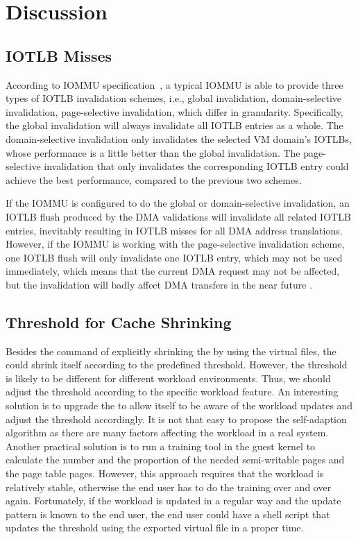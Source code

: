 \section{Discussion}\label{sec:dis}

\subsection{IOTLB Misses}
According to IOMMU specification~\cite{intelvt, amdvt}, a typical IOMMU is able to provide three types of IOTLB invalidation schemes, i.e., global invalidation, domain-selective invalidation, page-selective invalidation, which differ in granularity.
Specifically, the global invalidation will always invalidate all IOTLB entries as a whole.
The domain-selective invalidation only invalidates the selected VM domain's IOTLBs, whose performance is a little better than the global invalidation.
The page-selective invalidation that only invalidates the corresponding IOTLB entry could achieve the best performance, compared to the previous two schemes.

If the IOMMU is configured to do the global or domain-selective invalidation, an IOTLB flush produced by the DMA validations will invalidate all related IOTLB entries, inevitably resulting in IOTLB misses for all DMA address translations. However, if the IOMMU is working with the page-selective invalidation scheme, one IOTLB flush will only invalidate one IOTLB entry, which may not be used immediately, which means that the current DMA request may not be affected, but the invalidation will badly affect DMA transfers in the near future .

\subsection{Threshold for \name Cache Shrinking}
Besides the command of explicitly shrinking the \cache by using the virtual files, the \cache could shrink itself according to the predefined threshold.
However, the threshold is likely to be different for different workload environments.
Thus, we should adjust the threshold according to the specific workload feature.
An interesting solution is to upgrade the \cache to allow itself to be aware of the workload updates and adjust the threshold accordingly.
It is not that easy to propose the self-adaption algorithm as there are many factors affecting the workload in a real system.
Another practical solution is to run a training tool in the guest kernel to calculate the number and the proportion of the needed semi-writable pages and the page table pages.
However, this approach requires that the workload is relatively stable, otherwise the end user has to do the training over and over again.
Fortunately, if the workload is updated in a regular way and the update pattern is known to the end user, the end user could have a shell script that updates the threshold using the exported virtual file in a proper time.

